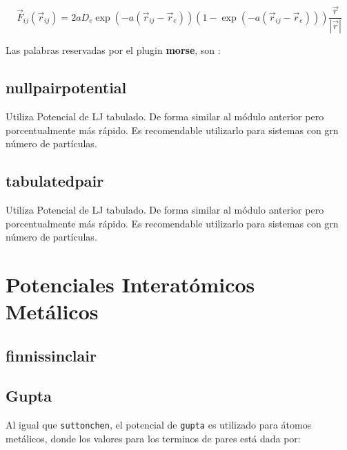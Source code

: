 $$\vec{F}_{ij} ( \vec{r}_{ij}) = 2aD_e\exp(-a(\vec{r}_{ij}-\vec{r}_e))\left(1-\exp(-a(\vec{r}_{ij}-\vec{r}_e))\right)\frac{\vec{r}}{|\vec{r}|}$$

Las palabras reservadas por el plugin \textbf{morse}, son :


\subsection{nullpairpotential}
Utiliza Potencial de LJ tabulado. De forma similar al m\'odulo anterior pero porcentualmente m\'as r\'apido. Es recomendable utilizarlo para sistemas con grn n\'umero de part\'iculas.

\subsection{tabulatedpair}
Utiliza Potencial de LJ tabulado. De forma similar al m\'odulo anterior pero porcentualmente m\'as r\'apido. Es recomendable utilizarlo para sistemas con grn n\'umero de part\'iculas.


\section{Potenciales Interat\'omicos Met\'alicos}

\subsection{finnissinclair}

\subsection{Gupta}

Al igual que \verb|suttonchen|, el potencial de \verb|gupta| es utilizado para \'atomos met\'alicos, donde los valores para los terminos de pares est\'a dada por:

